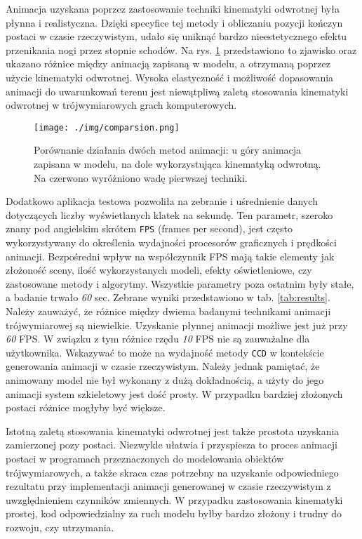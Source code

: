 \documentclass[11pt]{mwrep}
\begin{document}
\pagebreak

Animacja uzyskana poprzez zastosowanie techniki kinematyki odwrotnej była płynna i realistyczna. Dzięki specyfice tej metody i obliczaniu pozycji kończyn postaci w czasie rzeczywistym, udało się uniknąć bardzo nieestetycznego efektu przenikania nogi przez stopnie schodów. Na rys. \ref{img:irrikcomp} przedstawiono to zjawisko oraz ukazano różnice między animacją zapisaną w modelu, a otrzymaną poprzez użycie kinematyki odwrotnej. Wysoka elastyczność i możliwość dopasowania animacji do uwarunkowań terenu jest niewątpliwą zaletą stosowania kinematyki odwrotnej w trójwymiarowych grach komputerowych.


  \begin{figure}
  \centering
    \texttt{[image: ./img/comparsion.png]}
  \caption{Porównanie działania dwóch metod animacji: u góry animacja zapisana w modelu, na dole wykorzystująca kinematyką odwrotną. Na czerwono wyróżniono wadę pierwszej techniki.}
  \label{img:irrikcomp}
  \end{figure}

Dodatkowo aplikacja testowa pozwoliła na zebranie i uśrednienie danych dotyczących liczby wyświetlanych klatek na sekundę. Ten parametr, szeroko znany pod angielskim skrótem \texttt{FPS} (frames per second), jest często wykorzystywany do określenia wydajności procesorów graficznych i prędkości animacji. Bezpośredni wpływ na współczynnik FPS mają takie elementy jak złożoność sceny, ilość wykorzystanych modeli, efekty oświetleniowe, czy zastosowane metody i algorytmy. Wszystkie parametry poza ostatnim były stałe, a badanie trwało \textit{60} sec. Zebrane wyniki przedstawiono w tab. \ref{tab:results}. Należy zauważyć, że różnice między dwiema badanymi technikami animacji trójwymiarowej są niewielkie. Uzyskanie płynnej animacji możliwe jest już przy \textit{60} FPS. W związku z tym różnice rzędu \textit{10} FPS nie są zauważalne dla użytkownika. Wskazywać to może na wydajność metody \texttt{CCD} w kontekście generowania animacji w czasie rzeczywistym. Należy jednak pamiętać, że animowany model nie był wykonany z dużą dokładnością, a użyty do jego animacji system szkieletowy jest dość prosty. W przypadku bardziej złożonych postaci różnice mogłyby być większe.

Istotną zaletą stosowania kinematyki odwrotnej jest także prostota uzyskania zamierzonej pozy postaci. Niezwykle ułatwia i przyspiesza to proces animacji postaci w programach przeznaczonych do modelowania obiektów trójwymiarowych, a także skraca czas potrzebny na uzyskanie odpowiedniego rezultatu przy implementacji animacji generowanej  w czasie rzeczywistym z uwzględnieniem czynników zmiennych. W przypadku zastosowania kinematyki prostej, kod odpowiedzialny za ruch modelu byłby bardzo złożony i trudny do rozwoju, czy utrzymania.
\end{document}

